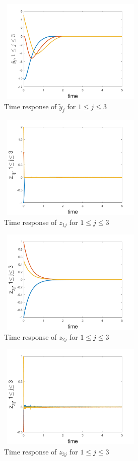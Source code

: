\documentclass[letterpaper, 10 pt, conference]{ieeeconf}  %
\begin{document}
\begin{figure}
\includegraphics[width=7cm,height=5cm]{yen}
\caption{Time response of $\tilde{y}_{j}$ for $1\leq j\leq
3$\label{yed}}
\end{figure}

\begin{figure}
\includegraphics[width=7cm,height=5cm]{z1}
\caption{Time response of $z_{1j}$ for $1\leq j\leq
3$\label{z1}}
\end{figure}
\begin{figure}
\includegraphics[width=7cm,height=5cm]{z2}
\caption{Time response of $z_{2j}$ for $1\leq j\leq
3$\label{z2}}
\end{figure}


\begin{figure}
\includegraphics[width=7cm,height=5cm]{z3}
\caption{Time response of $z_{3j}$ for $1\leq j\leq
3$\label{z3}}
\end{figure}
\end{document}
